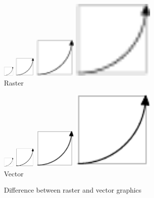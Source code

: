 \documentclass[a5paper, 10pt]{article}
\begin{document}
\begin{figure}[htbp]
  \centering
  \begin{minipage}{0.4\linewidth}
    \centering
    \includegraphics[width=0.5cm]{rasdemo}    
    \includegraphics[width=1cm]{rasdemo}
    \includegraphics[width=2cm]{rasdemo}
    \includegraphics[width=4cm]{rasdemo}\\
    Raster
  \end{minipage}
  \begin{minipage}{0.4\linewidth}
    \centering
    \includegraphics[width=0.5cm]{vecdemo}
    \includegraphics[width=1cm]{vecdemo}
    \includegraphics[width=2cm]{vecdemo}
    \includegraphics[width=4cm]{vecdemo}\\
    Vector
  \end{minipage}  
  \caption{Difference between raster and vector graphics}
  \label{fig:rastervector}
\end{figure}
\end{document}
